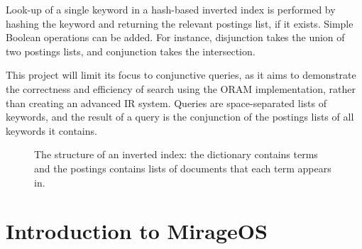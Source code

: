 \documentclass[12pt,a4paper,twoside,openright]{report}
\begin{document}
Look-up of a single keyword in a hash-based inverted index is performed by hashing the keyword and returning the relevant postings list, if it exists. Simple Boolean operations can be added. For instance, disjunction takes the union of two postings lists, and conjunction takes the intersection.

This project will limit its focus to conjunctive queries, as it aims to demonstrate the correctness and efficiency of search using the ORAM implementation, rather than creating an advanced IR system. Queries are space-separated lists of keywords, and the result of a query is the conjunction of the postings lists of all keywords it contains.

\begin{figure}
    \centering
    \caption{The structure of an inverted index: the dictionary contains terms and the postings contains lists of documents that each term appears in.}
    \label{fig:invertedIndex}
\end{figure}

\section{Introduction to MirageOS}
\end{document}
